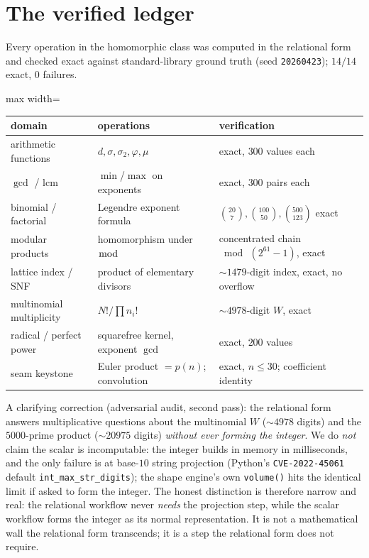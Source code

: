 \documentclass[11pt]{article}
\begin{document}
\section{The verified ledger}\label{sec:ledger}

Every operation in the homomorphic class was computed in the relational form and checked exact against
standard-library ground truth (seed \texttt{20260423}); $14/14$ exact, $0$ failures.

\begin{center}
\begin{adjustbox}{max width=\linewidth}\begin{tabular}{lll}
\toprule
domain & operations & verification \\
\midrule
arithmetic functions & $d,\sigma,\sigma_2,\varphi,\mu$ & exact, $300$ values each \\
$\gcd$ / $\mathrm{lcm}$ & $\min$/$\max$ on exponents & exact, $300$ pairs each \\
binomial / factorial & Legendre exponent formula & $\binom{20}{7},\binom{100}{50},\binom{500}{123}$ exact \\
modular products & homomorphism under $\bmod$ & concentrated chain $\bmod\,(2^{61}{-}1)$, exact \\
lattice index / SNF & product of elementary divisors & $\sim\!1479$-digit index, exact, no overflow \\
multinomial multiplicity & $N!/\prod n_i!$ & $\sim\!4978$-digit $W$, exact \\
radical / perfect power & squarefree kernel, exponent $\gcd$ & exact, $200$ values \\
\midrule
seam keystone & Euler product $=p(n)$; convolution & exact, $n\le 30$; coefficient identity \\
\bottomrule
\end{tabular}\end{adjustbox}
\end{center}

\noindent A clarifying correction (adversarial audit, second pass): the relational form answers
multiplicative questions about the multinomial $W$ ($\sim\!4978$ digits) and the $5000$-prime product
($\sim\!20975$ digits) \emph{without ever forming the integer}. We do \emph{not} claim the scalar is
incomputable: the integer builds in memory in milliseconds, and the only failure is at base-$10$ string
projection (Python's \texttt{CVE-2022-45061} default \texttt{int\_max\_str\_digits}); the shape engine's
own \texttt{volume()} hits the identical limit if asked to form the integer. The honest distinction is
therefore narrow and real: the relational workflow never \emph{needs} the projection step, while the scalar
workflow forms the integer as its normal representation. It is not a mathematical wall the relational form
transcends; it is a step the relational form does not require.
\end{document}
